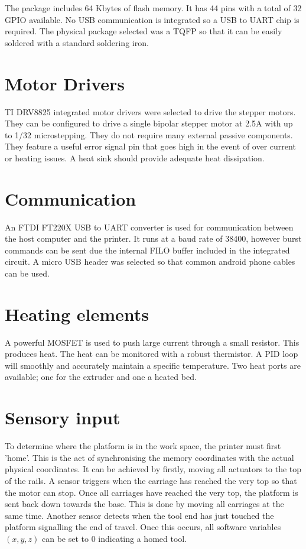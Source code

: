 \documentclass[a4paper, 11pt, twoside]{Thesis}  %
\begin{document}
The package includes 64 Kbytes of flash memory. It has 44 pins with a total of 32 GPIO available. No USB communication is integrated so a USB to UART chip is required. The physical package selected was a TQFP so that it can be easily soldered with a standard soldering iron.


\section{Motor Drivers}

TI DRV8825 integrated motor drivers were selected to drive the stepper motors. They can be configured to drive a single bipolar stepper motor at 2.5A with up to 1/32 microstepping. They do not require many external passive components. They feature a useful error signal pin that goes high in the event of over current or heating issues. A heat sink should provide adequate heat dissipation.
\section{Communication}

An FTDI FT220X USB to UART converter is used for communication between the host computer and the printer. It runs at a baud rate of 38400, however burst commands can be sent due the internal FILO buffer included in the integrated circuit. A micro USB header was selected so that common android phone cables can be used.
\section{Heating elements}

A powerful MOSFET is used to push large current through a small resistor. This produces heat. The heat can be monitored with a robust thermistor. A PID loop will smoothly and accurately maintain a specific temperature. Two heat ports are available; one for the extruder and one a heated bed.
\section{Sensory input}

To determine where the platform is in the work space, the printer must first 'home'. This is the act of synchronising the memory coordinates with the actual physical coordinates. It can be achieved by firstly, moving all actuators to the top of the rails. A sensor triggers when the carriage has reached the very top so that the motor can stop. Once all carriages have reached the very top, the platform is sent back down towards the base. This is done by moving all carriages at the same time. Another sensor detects when the tool end has just touched the platform signalling the end of travel. Once this occurs, all software variables $(x,y,z)$ can be set to 0 indicating a homed tool.
\end{document}
